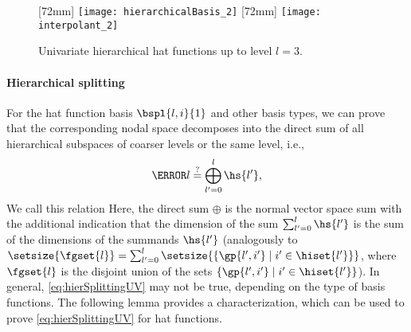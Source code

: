 \begin{figure}
  [72mm]{%
    \texttt{[image: hierarchicalBasis\_2]}%
  }%
  \hfill%
  [72mm]{%
    \texttt{[image: interpolant\_2]}%
  }%
  \caption[%
    Univariate hierarchical hat functions%
  ]{%
    Univariate hierarchical hat functions up to level $l = 3$.%
  }%
  \label{fig:hierarchicalHat}%
\end{figure}

\paragraph{Hierarchical splitting}

For the hat function basis $\bspl{l,i}{1}$ and other basis types,
we can prove that the corresponding nodal space
decomposes into the direct sum of all
hierarchical subspaces of coarser levels or the same level, i.e.,
\begin{equation}
  \label{eq:hierSplittingUV}
  \ns{l}
  \overset{?}{=} \bigoplus_{l'=0}^l \hs{l'},
\end{equation}
We call this relation 
Here, the direct sum $\oplus$ is
the normal vector space sum with the additional indication
that the dimension of the sum $\sum_{l'=0}^l \hs{l'}$ is the sum
of the dimensions of the summands $\hs{l'}$
(analogously to
$\setsize{\fgset{l}}
= \sum_{l'=0}^l \setsize{\{\gp{l',i'} \mid i' \in \hiset{l'}\}}$,
where $\fgset{l}$ is the disjoint union of the sets
$\{\gp{l',i'} \mid i' \in \hiset{l'}\}$).
In general, \eqref{eq:hierSplittingUV} may not be true,
depending on the type of basis functions.
The following lemma provides a characterization,
which can be used to prove \eqref{eq:hierSplittingUV} for hat functions.

